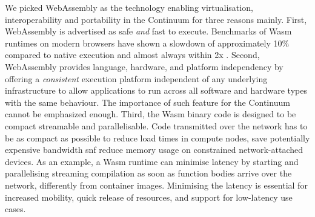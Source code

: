 We picked WebAssembly as the technology enabling virtualisation, interoperability and portability in the Continuum for three reasons mainly. First, WebAssembly is advertised as safe \textit{and} fast to execute. Benchmarks of Wasm runtimes on modern browsers have shown a slowdown of approximately 10\% compared to native execution and almost always within 2x \cite{haas2017bringing}. Second, WebAssembly provides language, hardware, and platform independency by offering a \textit{consistent} execution platform independent of any underlying infrastructure to allow applications to run across all software and hardware types with the same behaviour. The importance of such feature for the Continuum cannot be emphasized enough. Third, the Wasm binary code is designed to be compact streamable and parallelisable. Code transmitted over the network has to be as compact as possible to reduce load times in compute nodes, save potentially expensive bandwidth snf reduce memory usage on constrained network-attached devices. As an example, a Wasm runtime can minimise latency by starting and parallelising streaming compilation as soon as function bodies arrive over the network, differently from container images. Minimising the latency is essential for increased mobility, quick release of resources, and support for low-latency use cases.


